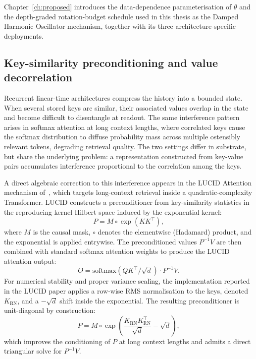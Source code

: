Chapter~\ref{ch:proposed} introduces the data-dependence
parameterisation of $\theta$ and the depth-graded rotation-budget
schedule used in this thesis as the Damped Harmonic Oscillator
mechanism, together with its three architecture-specific deployments.

\subsection{Key-similarity preconditioning and value decorrelation}\label{sec:primitives:cvd}

Recurrent linear-time architectures compress the history into a
bounded state. When several stored keys are similar, their associated
values overlap in the state and become difficult to disentangle at
readout. The same interference pattern arises in softmax attention at
long context lengths, where correlated keys cause the softmax
distribution to diffuse probability mass across multiple ostensibly
relevant tokens, degrading retrieval quality. The two settings differ
in substrate, but share the underlying problem: a representation
constructed from key-value pairs accumulates interference proportional
to the correlation among the keys.

A direct algebraic correction to this interference appears in the
LUCID Attention mechanism of~\citet{duvvuri2026lucid}, which targets
long-context retrieval inside a quadratic-complexity Transformer.
LUCID constructs a preconditioner from key-similarity statistics in
the reproducing kernel Hilbert space induced by the exponential
kernel:
\begin{equation}\label{eq:lucid-base}
P = M \circ \exp(K K^{\top}),
\end{equation}
where $M$ is the causal mask, $\circ$ denotes the elementwise
(Hadamard) product, and the exponential is applied entrywise. The
preconditioned values $P^{-1} V$ are then combined with standard
softmax attention weights to produce the LUCID attention output:
\begin{equation}\label{eq:lucid-output}
O = \mathrm{softmax}(Q K^{\top} / \sqrt{d}) \cdot P^{-1} V.
\end{equation}
For numerical stability and proper variance scaling, the
implementation reported in the LUCID paper applies a row-wise RMS
normalisation to the keys, denoted $K_{\mathrm{RN}}$, and a
$-\sqrt{d}$ shift inside the exponential. The resulting preconditioner
is unit-diagonal by construction:
\begin{equation}\label{eq:lucid-rn}
P = M \circ \exp\!\left( \frac{K_{\mathrm{RN}} K_{\mathrm{RN}}^{\top}}{\sqrt{d}} - \sqrt{d} \right),
\end{equation}
which improves the conditioning of $P$ at long context lengths and
admits a direct triangular solve for $P^{-1} V$.

